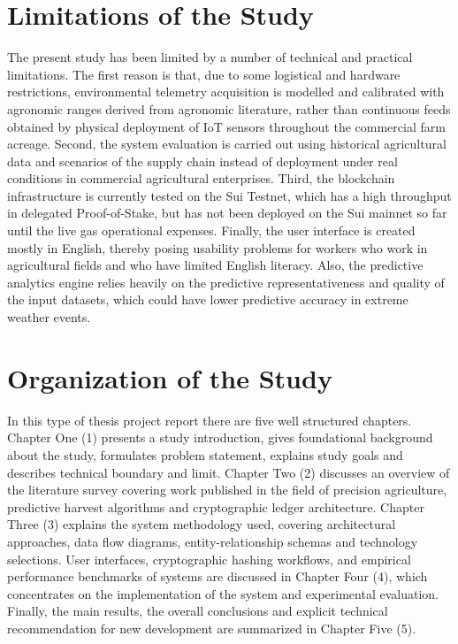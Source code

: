 \section{Limitations of the Study}

The present study has been limited by a number of technical and practical limitations. The first reason is that, due to some logistical and hardware restrictions, environmental telemetry acquisition is modelled and calibrated with agronomic ranges derived from agronomic literature, rather than continuous feeds obtained by physical deployment of IoT sensors throughout the commercial farm acreage. Second, the system evaluation is carried out using historical agricultural data and scenarios of the supply chain instead of deployment under real conditions in commercial agricultural enterprises. Third, the blockchain infrastructure is currently tested on the Sui Testnet, which has a high throughput in delegated Proof-of-Stake, but has not been deployed on the Sui mainnet so far until the live gas operational expenses. Finally, the user interface is created mostly in English, thereby posing usability problems for workers who work in agricultural fields and who have limited English literacy. Also, the predictive analytics engine relies heavily on the predictive representativeness and quality of the input datasets, which could have lower predictive accuracy in extreme weather events.

\section{Organization of the Study}

In this type of thesis project report there are five well structured chapters. Chapter One (1) presents a study introduction, gives foundational background about the study, formulates problem statement, explains study goals and describes technical boundary and limit. Chapter Two (2) discusses an overview of the literature survey covering work published in the field of precision agriculture, predictive harvest algorithms and cryptographic ledger architecture. Chapter Three (3) explains the system methodology used, covering architectural approaches, data flow diagrams, entity-relationship schemas and technology selections. User interfaces, cryptographic hashing workflows, and empirical performance benchmarks of systems are discussed in Chapter Four (4), which concentrates on the implementation of the system and experimental evaluation. Finally, the main results, the overall conclusions and explicit technical recommendation for new development are summarized in Chapter Five (5).

